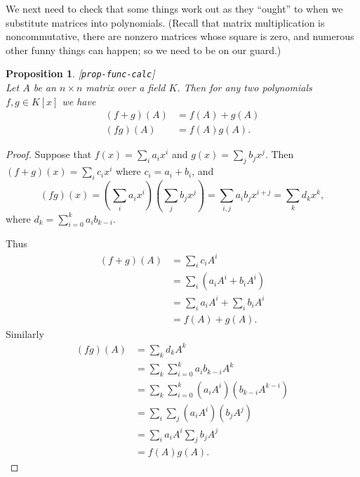 \documentclass{amsart}
\newcommand{\lbl}[1]{\label{#1}\textup{[\texttt{#1}]}\ \\}
\newcommand{\lbl}{\label}
\newcommand{\tm}        {\times}
\renewcommand{\:}{\colon}
\newtheorem{proposition}[theorem]{Proposition}
\theoremstyle{definition}
\begin{document}
We next need to check that some things work out as they ``ought'' to
when we substitute matrices into polynomials.  (Recall that matrix
multiplication is noncommutative, there are nonzero matrices whose
square is zero, and numerous other funny things can happen; so we need
to be on our guard.)
\begin{proposition}\lbl{prop-func-calc}
 Let $A$ be an $n\tm n$ matrix over a field $K$.  Then for any two
 polynomials $f,g\in K[x]$ we have
 \begin{align*}
  (f+g)(A) &= f(A) + g(A) \\
  (fg)(A)  &= f(A) g(A).
 \end{align*}
\end{proposition}
\begin{proof}
 Suppose that $f(x)=\sum_i a_ix^i$ and $g(x)=\sum_jb_jx^j$.  Then
 $(f+g)(x)=\sum_i c_ix^i$ where $c_i=a_i+b_i$, and
 \[ (fg)(x)=(\sum_ia_ix^i)(\sum_jb_jx^j) = 
            \sum_{i,j} a_ib_j x^{i+j} =
            \sum_k d_kx^k, 
 \] 
 where $d_k=\sum_{i=0}^k a_ib_{k-i}$.

 Thus
 \begin{align*}
  (f+g)(A) &= \sum_i c_i A^i \\
           &= \sum_i (a_iA^i + b_iA^i) \\
           &= \sum_i a_iA^i + \sum_i b_iA^i \\
           &= f(A) + g(A).
 \end{align*}
 Similarly
 \begin{align*}
  (fg)(A) &= \sum_k d_kA^k \\
          &= \sum_k\sum_{i=0}^k a_ib_{k-i} A^k \\
          &= \sum_k\sum_{i=0}^k (a_i A^i)(b_{k-i} A^{k-i}) \\
          &= \sum_i\sum_j (a_iA^i)(b_jA^j) \\
          &= \sum_i a_iA^i \sum_j b_jA^j \\
          &= f(A) g(A).
 \end{align*}
\end{proof}
\end{document}
